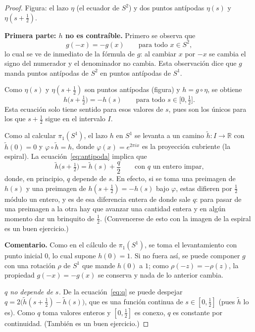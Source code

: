 \documentclass[11pt]{article}
\begin{document}
\begin{proof}
\noindent Figura: el lazo $\eta$ (el ecuador de $S^2$) y dos puntos antípodas $\eta(s)$ y $\eta(s+\tfrac12)$.

\medskip\noindent\textbf{Primera parte: $h$ no es contraíble.}
Primero se observa que
\[
  g(-x)=-g(x)\qquad\text{para todo }x\in S^2,
\]
lo cual se ve de inmediato de la fórmula de $g$: al cambiar $x$ por $-x$ se cambia el signo del numerador y el denominador no cambia. Esta observación dice que $g$ manda puntos antípodas de $S^2$ en puntos antípodas de $S^1$.

Como $\eta(s)$ y $\eta(s+\tfrac12)$ son puntos antípodas (figura) y $h=g\circ\eta$, se obtiene
\begin{equation}\label{eq:antipoda}
  h\bigl(s+\tfrac12\bigr)=-h(s)\qquad\text{para todo }s\in\bigl[0,\tfrac12\bigr].
\end{equation}
Esta ecuación solo tiene sentido para esos valores de $s$, pues son los únicos para los que $s+\tfrac12$ sigue en el intervalo $I$.

Como al calcular $\pi_1(S^1)$, el lazo $h$ en $S^1$ se levanta a un camino $\tilde h\colon I\to\mathbb{R}$ con $\tilde h(0)=0$ y $\varphi\circ\tilde h=h$, donde $\varphi(x)=e^{2\pi i x}$ es la proyección cubriente (la espiral). La ecuación~\eqref{eq:antipoda} implica que
\begin{equation}\label{eq:q}
  \tilde h\bigl(s+\tfrac12\bigr)=\tilde h(s)+\frac{q}{2}\qquad\text{con }q\text{ un entero impar,}
\end{equation}
donde, en principio, $q$ depende de $s$. En efecto, si se toma una preimagen de $h(s)$ y una preimagen de $h(s+\tfrac12)=-h(s)$ bajo $\varphi$, estas difieren por $\tfrac12$ módulo un entero, y es de esa diferencia entera de donde sale $q$: para pasar de una preimagen a la otra hay que avanzar una cantidad entera y en algún momento dar un brinquito de $\tfrac12$. (Convencerse de esto con la imagen de la espiral es un buen ejercicio.)

\noindent\textbf{Comentario.} Como en el cálculo de $\pi_1(S^1)$, se toma el levantamiento con punto inicial $0$, lo cual supone $h(0)=1$. Si no fuera así, se puede componer $g$ con una rotación $\rho$ de $S^1$ que mande $h(0)$ a $1$; como $\rho(-z)=-\rho(z)$, la propiedad $g(-x)=-g(x)$ se conserva y nada de lo anterior cambia.

\medskip
\textit{$q$ no depende de $s$.} De la ecuación~\eqref{eq:q} se puede despejar $q=2\bigl(\tilde h(s+\tfrac12)-\tilde h(s)\bigr)$, que es una función continua de $s\in[0,\tfrac12]$ (pues $\tilde h$ lo es). Como $q$ toma valores enteros y $[0,\tfrac12]$ es conexo, $q$ es constante por continuidad. (También es un buen ejercicio.)


\end{proof}
\end{document}
